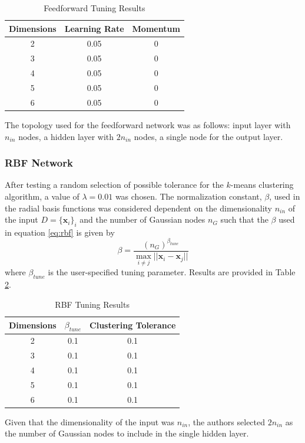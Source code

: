 \documentclass[conference]{IEEEtran}
\begin{document}
  \begin{table}[h]
  \caption{Feedforward Tuning Results}
  \resizebox{1.3\textwidth}{!} {\begin{minipage}{\textwidth}

      \begin{tabular}{ c | c | c }
        Dimensions & Learning Rate & Momentum \\ \hline
        2 & 0.05 & 0 \\
        3 & 0.05 & 0 \\
        4 & 0.05 & 0 \\
        5 & 0.05 & 0 \\
        6 & 0.05 & 0
      \end{tabular}

      \label{table:ffTuning}
  \end{minipage} }
\end{table}
  The topology used for the feedforward network was as follows: input layer with $n_{in}$ nodes, a hidden layer with $2n_{in}$ nodes, a single node for the output layer.
  
  \subsubsection{RBF Network}
  After testing a random selection of possible tolerance for the $k$-means clustering algorithm, a value of $\lambda = 0.01$ was chosen. The normalization constant, $\beta$, used in the radial basis functions was considered dependent on the dimensionality $n_{in}$ of the input $D = \{\mathbf{x}_i\}_i$ and the number of Gaussian nodes $n_G$ such that the $\beta$ used in equation \ref{eq:rbf} is given by
  $$
  \beta = \frac{(n_G)^{\beta_{tune}}}{\max_{i \not= j} || \mathbf{x}_i - \mathbf{x}_j ||}
  $$
  where $\beta_{tune}$ is the user-specified tuning parameter. Results are provided in Table \ref{table:rbfTuning}.

\begin{table}[h]
  \caption{RBF Tuning Results}
  \resizebox{1.3\textwidth}{!} {\begin{minipage}{\textwidth}

      
      \begin{tabular}{ c | c | c }
        Dimensions & $\beta_{tune}$ & Clustering Tolerance \\ \hline
        2 & 0.1 & 0.1 \\
        3 & 0.1 & 0.1 \\
        4 & 0.1 & 0.1 \\
        5 & 0.1 & 0.1 \\
        6 & 0.1 & 0.1
      \end{tabular}

      \label{table:rbfTuning}
  \end{minipage} }
\end{table}
Given that the dimensionality of the input was $n_{in}$, the authors selected $2n_{in}$ as the number of Gaussian nodes to include in the single hidden layer.
\end{document}
